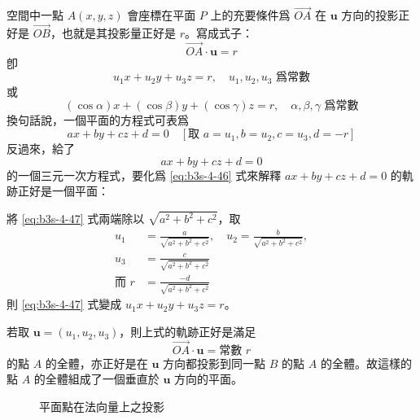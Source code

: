 空間中一點 $A(x, y, z)$ 會座標在平面 $P$ 上的充要條件爲 $\vec{OA}$ 在 $\mathbf{u}$ 方向的投影正好是 $\vec{OB}$，也就是其投影量正好是 $r$。寫成式子：
\[
\vec{OA} \cdot \mathbf{u} = r
\]
卽
\begin{equation}
u_1 x + u_2 y + u_3 z = r, \quad u_1, u_2, u_3 \text{ 爲常數}
\label{eq:b3s-4-45}
\end{equation}
或
\begin{equation}
(\cos\alpha)x + (\cos\beta)y + (\cos\gamma)z = r, \quad \alpha, \beta, \gamma \text{ 爲常數}
\label{eq:b3s-4-46}
\end{equation}
換句話說，一個平面的方程式可表爲
\[
ax + by + cz + d = 0 \quad [\text{取 } a=u_1, b=u_2, c=u_3, d=-r]
\]
反過來，給了
\begin{equation}
ax + by + cz + d = 0
\label{eq:b3s-4-47}
\end{equation}
的一個三元一次方程式，要化爲 \eqref{eq:b3s-4-46} 式來解釋 $ax + by + cz + d = 0$ 的軌跡正好是一個平面：

將 \eqref{eq:b3s-4-47} 式兩端除以 $\sqrt{a^2 + b^2 + c^2}$，取
\begin{equation}
\begin{aligned}
u_1 &= \frac{a}{\sqrt{a^2 + b^2 + c^2}}, \quad u_2 = \frac{b}{\sqrt{a^2 + b^2 + c^2}}, \\
u_3 &= \frac{c}{\sqrt{a^2 + b^2 + c^2}} \\
\text{而 } r &= \frac{-d}{\sqrt{a^2 + b^2 + c^2}}
\end{aligned}
\label{eq:b3s-4-48}
\end{equation}
則 \eqref{eq:b3s-4-47} 式變成 $u_1 x + u_2 y + u_3 z = r$。

若取 $\mathbf{u} = (u_1, u_2, u_3)$，則上式的軌跡正好是滿足
\[
\vec{OA} \cdot \mathbf{u} = \text{常數 } r
\]
的點 $A$ 的全體，亦正好是在 $\mathbf{u}$ 方向都投影到同一點 $B$ 的點 $A$ 的全體。故這樣的點 $A$ 的全體組成了一個垂直於 $\mathbf{u}$ 方向的平面。

\begin{figure}[H]
\centering
{}
\caption{平面點在法向量上之投影}
\label{fig:4-67}
\end{figure}

